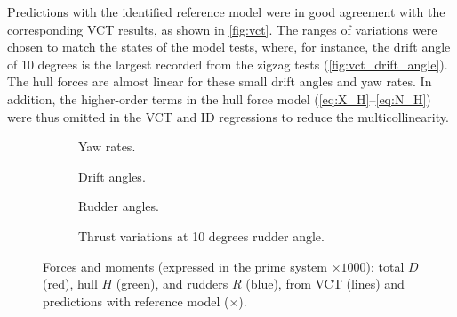 Predictions with the identified reference model were in good agreement with the corresponding VCT results, as shown in \autoref{fig:vct}. The ranges of variations were chosen to match the states of the model tests, where, for instance, the drift angle of 10 degrees is the largest recorded from the zigzag tests (\autoref{fig:vct_drift_angle}). The hull forces are almost linear for these small drift angles and yaw rates. In addition, the higher-order terms in the hull force model (\autoref{eq:X_H}--\autoref{eq:N_H}) were thus omitted in the VCT and ID regressions to reduce the multicollinearity.
\begin{figure}
    \centering
    \begin{subfigure}[b]{0.49\textwidth}
        \centering
        
        \caption{Yaw rates.}
        \label{fig:vct_circle}
    \end{subfigure}
    \hfill
    \begin{subfigure}[b]{0.49\textwidth}
        \centering
        
        \caption{Drift angles.}
        \label{fig:vct_drift_angle}
    \end{subfigure}
    \begin{subfigure}[b]{0.49\textwidth}
        \centering
        
        \caption{Rudder angles.}
        \label{fig:vct_rudder_angle}
    \end{subfigure}
    \hfill
    \begin{subfigure}[b]{0.49\textwidth}
        \centering
        
        \caption{Thrust variations at 10 degrees rudder angle.}
        \label{fig:vct_thrust_variation}
    \end{subfigure}
    \caption{Forces and moments (expressed in the prime system $\times 1000$): total $D$ (red), hull $H$ (green), and rudders $R$ (blue), from VCT (lines) and predictions with reference model ($\times$).}
    \label{fig:vct}
\end{figure}